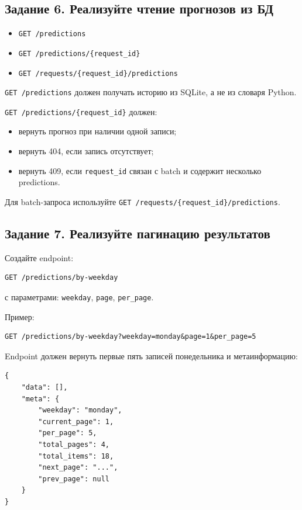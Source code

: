 \documentclass[12pt,a4paper]{article}
\begin{document}
\subsection{Задание 6. Реализуйте чтение прогнозов из БД}

\begin{itemize}
    \item \texttt{GET /predictions}
    \item \texttt{GET /predictions/\{request\_id\}}
    \item \texttt{GET /requests/\{request\_id\}/predictions}
\end{itemize}

\texttt{GET /predictions} должен получать историю из SQLite, а не из словаря Python.

\texttt{GET /predictions/\{request\_id\}} должен:

\begin{itemize}
    \item вернуть прогноз при наличии одной записи;
    \item вернуть 404, если запись отсутствует;
    \item вернуть 409, если \texttt{request\_id} связан с batch и содержит несколько predictions.
\end{itemize}

Для batch-запроса используйте \texttt{GET /requests/\{request\_id\}/predictions}.

\subsection{Задание 7. Реализуйте пагинацию результатов}

Создайте endpoint:

\begin{lstlisting}[caption={Пагинация по дню недели}]
GET /predictions/by-weekday
\end{lstlisting}

с параметрами: \texttt{weekday}, \texttt{page}, \texttt{per\_page}.

Пример:

\begin{lstlisting}[caption={Пример запроса}]
GET /predictions/by-weekday?weekday=monday&page=1&per_page=5
\end{lstlisting}

Endpoint должен вернуть первые пять записей понедельника и метаинформацию:

\begin{lstlisting}[caption={Пример ответа пагинации}]
{
    "data": [],
    "meta": {
        "weekday": "monday",
        "current_page": 1,
        "per_page": 5,
        "total_pages": 4,
        "total_items": 18,
        "next_page": "...",
        "prev_page": null
    }
}
\end{lstlisting}
\end{document}
